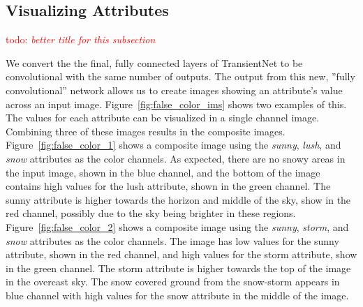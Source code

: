 \documentclass[10pt,twocolumn,letterpaper]{article}
\newcommand{\todo}[1]{\textcolor{red}{todo: {\em #1}}}
\newcommand{\figref}[1]{Figure~\ref{fig:#1}}
\begin{document}
\subsection{Visualizing Attributes}
\todo{better title for this subsection}

We convert the the final, fully connected layers of TransientNet to be
convolutional with the same number of outputs.  The output from this new,
''fully convolutional'' network allows us to create images showing an
attribute's value across an input image.  \figref{false_color_ims} shows two
examples of this.  The values for each attribute can be visualized in a single
channel image.  Combining three of these images results in the composite
images.  \figref{false_color_1} shows a composite image using the
\textit{sunny}, \textit{lush}, and \textit{snow} attributes as the color
channels.  As expected, there are no snowy areas in the input image, shown
in the blue channel, and the bottom of the image contains high values for the
lush attribute, shown in the green channel.  The sunny attribute is higher 
towards the horizon and middle of the sky, show in the red channel, possibly 
due to the sky being brighter in these regions.  \figref{false_color_2} shows
a composite image using the \textit{sunny}, \textit{storm}, and \textit{snow}
attributes as the color channels.  The image has low values for the sunny
attribute, shown in the red channel, and high values for the storm attribute,
show in the green channel.  The storm attribute is higher towards the top
of the image in the overcast sky.  The snow covered ground from the 
snow-storm appears in blue channel with high values for the snow attribute in
the middle of the image.
\end{document}
